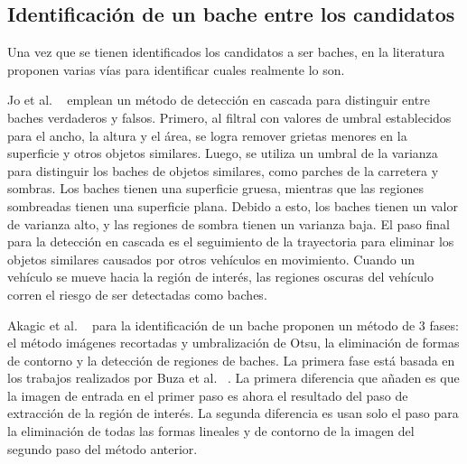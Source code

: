 \subsection{Identificación de un bache entre los candidatos}
Una vez que se tienen identificados los candidatos a ser baches, en la literatura proponen varias vías para  
identificar cuales realmente lo son.

Jo et al. ~ emplean un método de detección en cascada para distinguir
entre baches verdaderos y falsos. Primero, al filtral con valores de umbral establecidos para el ancho, la
altura y el área, se logra remover grietas menores en la superficie y otros objetos similares. Luego, 
se utiliza un umbral de la varianza para distinguir los baches de objetos similares, como parches de 
la carretera y sombras. Los baches tienen una superficie gruesa, mientras que las regiones sombreadas 
tienen una superficie plana. Debido a esto, los baches tienen un valor de varianza alto, y las regiones 
de sombra tienen un varianza baja. El paso final para la detección en cascada es el seguimiento de 
la trayectoria para eliminar los objetos similares causados por otros vehículos en movimiento. 
Cuando un vehículo se mueve hacia la región de interés, las regiones oscuras del vehículo
corren el riesgo de ser detectadas como baches.

Akagic et al. ~ para la identificación de un bache proponen un método de 3 fases:
el método imágenes recortadas y umbralización de Otsu, la eliminación de formas de contorno y la detección 
de regiones de baches. La primera fase está basada en los trabajos realizados por  Buza et al. ~.
La primera diferencia que añaden es que la imagen de entrada en el primer paso es ahora el resultado del paso de extracción 
de la región de interés. La segunda diferencia es usan solo el paso para la eliminación de todas las formas lineales y de contorno de la imagen del
segundo paso del método anterior.


